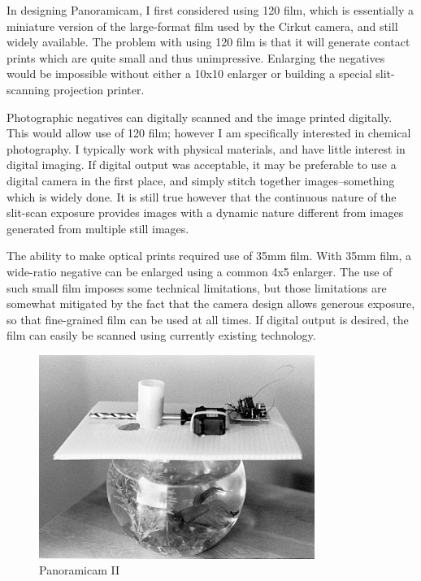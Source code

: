 \documentclass[dvips,12pt]{article}
\begin{document}
In designing Panoramicam, I first considered using 120 film, which is essentially a miniature version of the large-format film used by the Cirkut camera, and still widely available. The problem with using 120 film is that it will generate contact prints which are quite small and thus unimpressive. Enlarging the negatives would be impossible without either a 10x10 enlarger or building a special slit-scanning projection printer. 

Photographic negatives can digitally scanned and the image printed digitally. This would allow use of 120 film; however I am specifically interested in chemical photography. I typically work with physical materials, and have little interest in digital imaging. If digital output was acceptable, it may be preferable to use a digital camera in the first place, and simply stitch together images--something which is widely done. It is still true however that the continuous nature of the slit-scan exposure provides images with a dynamic nature different from images generated from multiple still images.

The ability to make optical prints required use of 35mm film. With 35mm film, a wide-ratio negative can be enlarged using a common 4x5 enlarger. The use of such small film imposes some technical limitations, but those limitations are somewhat mitigated by the fact that the camera design allows generous exposure, so that fine-grained film can be used at all times. If digital output is desired, the film can easily be scanned using currently existing technology.

\begin{figure}[htb]
    \includegraphics[width=0.8\textwidth]{test}
    \caption{Panoramicam II}
    \label{fig:pano}
\end{figure}
\end{document}
